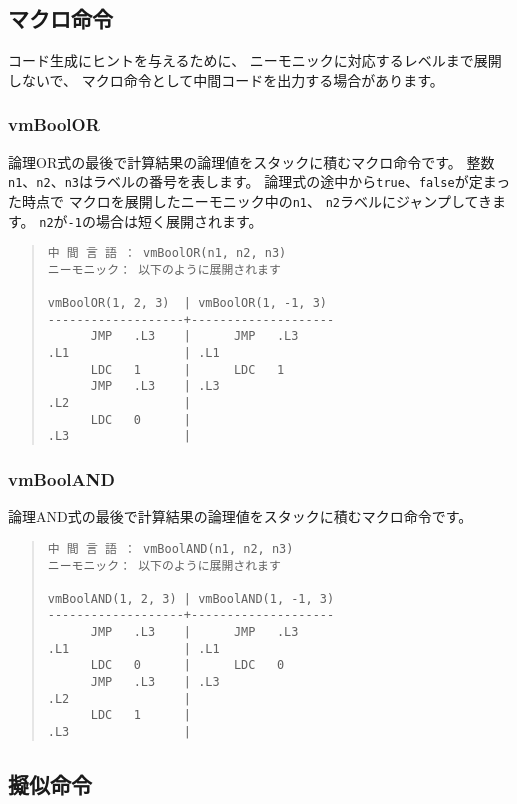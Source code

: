 \subsection{マクロ命令}

コード生成にヒントを与えるために、
ニーモニックに対応するレベルまで展開しないで、
マクロ命令として中間コードを出力する場合があります。

\subsubsection{vmBoolOR}

論理OR式の最後で計算結果の論理値をスタックに積むマクロ命令です。
整数\verb/n1/、\verb/n2/、\verb/n3/はラベルの番号を表します。
論理式の途中から\verb/true/、\verb/false/が定まった時点で
マクロを展開したニーモニック中の\verb/n1/、
\verb/n2/ラベルにジャンプしてきます。
\verb/n2/が\verb/-1/の場合は短く展開されます。

\begin{quote}
\begin{verbatim}
中 間 言 語 ： vmBoolOR(n1, n2, n3)
ニーモニック： 以下のように展開されます

vmBoolOR(1, 2, 3)  | vmBoolOR(1, -1, 3)
-------------------+--------------------
      JMP   .L3    |      JMP   .L3
.L1                | .L1
      LDC   1      |      LDC   1
      JMP   .L3    | .L3
.L2                |
      LDC   0      |
.L3                |
\end{verbatim}
\end{quote}

\subsubsection{vmBoolAND}

論理AND式の最後で計算結果の論理値をスタックに積むマクロ命令です。

\begin{quote}
\begin{verbatim}
中 間 言 語 ： vmBoolAND(n1, n2, n3)
ニーモニック： 以下のように展開されます

vmBoolAND(1, 2, 3) | vmBoolAND(1, -1, 3)
-------------------+--------------------
      JMP   .L3    |      JMP   .L3
.L1                | .L1
      LDC   0      |      LDC   0
      JMP   .L3    | .L3
.L2                |
      LDC   1      |
.L3                |
\end{verbatim}
\end{quote}

\subsection{擬似命令}

